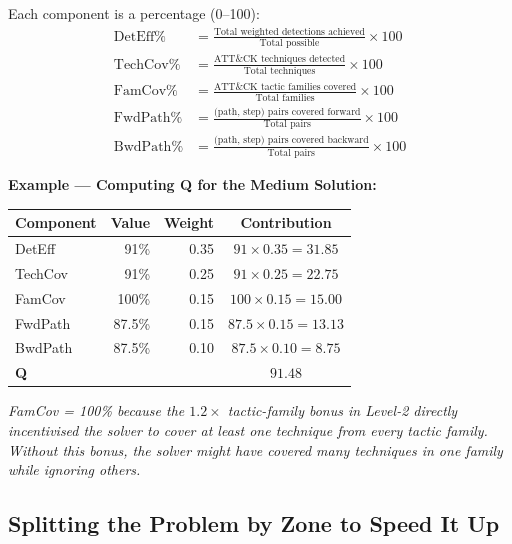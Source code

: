 \documentclass[journal]{IEEEtran}
\begin{document}
Each component is a percentage (0--100):
\begin{align}
  \text{DetEff}\%  &=
    \frac{\text{Total weighted detections achieved}}
         {\text{Total possible}} \times 100 \\[3pt]
  \text{TechCov}\% &=
    \frac{\text{ATT\&CK techniques detected}}
         {\text{Total techniques}} \times 100 \\[3pt]
  \text{FamCov}\%  &=
    \frac{\text{ATT\&CK tactic families covered}}
         {\text{Total families}} \times 100 \\[3pt]
  \text{FwdPath}\% &=
    \frac{\text{(path, step) pairs covered forward}}
         {\text{Total pairs}} \times 100 \\[3pt]
  \text{BwdPath}\% &=
    \frac{\text{(path, step) pairs covered backward}}
         {\text{Total pairs}} \times 100
\end{align}

\begin{examplebox}
\textbf{Example --- Computing Q for the Medium Solution:}
\begin{center}
\small
\renewcommand{\arraystretch}{1.2}
\begin{tabular}{@{}lrrc@{}}
\toprule
\textbf{Component} & \textbf{Value} & \textbf{Weight} &
\textbf{Contribution} \\
\midrule
DetEff   & 91\%   & 0.35 & $91\times0.35=31.85$ \\
TechCov  & 91\%   & 0.25 & $91\times0.25=22.75$ \\
FamCov   & 100\%  & 0.15 & $100\times0.15=15.00$ \\
FwdPath  & 87.5\% & 0.15 & $87.5\times0.15=13.13$ \\
BwdPath  & 87.5\% & 0.10 & $87.5\times0.10=8.75$ \\
\midrule
\textbf{Q} & & & $\mathbf{91.48}$ \\
\bottomrule
\end{tabular}
\end{center}
\textit{FamCov = 100\% because the $1.2\times$ tactic-family
bonus in Level-2 directly incentivised the solver to cover
at least one technique from every tactic family.
Without this bonus, the solver might have covered many
techniques in one family while ignoring others.}
\end{examplebox}

\subsection{Splitting the Problem by Zone to Speed It Up}
\end{document}
